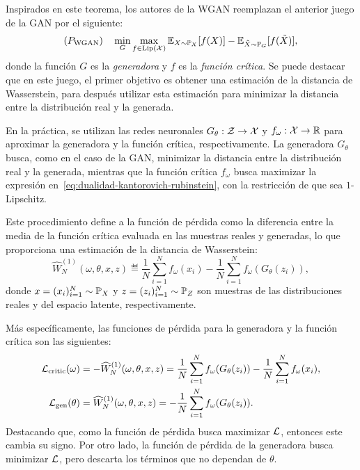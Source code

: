 Inspirados en este teorema, los autores de la WGAN \cite{arjovsky2017wasserstein} reemplazan el anterior juego de la GAN por el siguiente:
\begin{equation}\label{eq:wgan-game}
    (P_{\mathrm{WGAN}}) \quad \min_{G} \max_{f \in \Lip[\cX]} \Exp_{X\sim \Prob_X} [f(X)] - \Exp_{\tilde X \sim \Prob_G} [f(\tilde X)],
\end{equation}
donde la función $G$ es la \textit{generadora} y $f$ es la \textit{función crítica}. Se puede destacar que en este juego, el primer objetivo es obtener una estimación de la distancia de Wasserstein, para después utilizar esta estimación para minimizar la distancia entre la distribución real y la generada.

En la práctica, se utilizan las redes neuronales $G_\theta: \mathcal{Z} \to \mathcal{X}$ y $f_\omega: \mathcal{X} \to \mathbb{R}$ para aproximar la generadora y la función crítica, respectivamente.
La generadora $G_\theta$ busca, como en el caso de la GAN, minimizar la distancia entre la distribución real y la generada, mientras que la función crítica $f_\omega$ busca maximizar la expresión en~\eqref{eq:dualidad-kantorovich-rubinstein}, con la restricción de que sea $1$-Lipschitz.

Este procedimiento define a la función de pérdida como
la diferencia entre la media de la función crítica evaluada en las muestras reales y generadas, lo que proporciona una estimación de la distancia de Wasserstein:
\begin{equation}\label{eq:wasserstein-estimation}
    \widehat W_N^{(1)} (
    \omega, \theta, x, z
    )
    \eqdef \frac{1}{N}\sum_{i=1}^{N} f_\omega(x_i) - \frac{1}{N}\sum_{i=1}^{N} f_\omega(G_\theta(z_i)),
\end{equation}
donde $x = (x_i)_{i=1}^{N} \sim \Prob_X$ y $z = (z_i)_{i=1}^{N} \sim \Prob_Z$ son muestras de las distribuciones reales y del espacio latente, respectivamente.

Más específicamente, las funciones de pérdida para la generadora y la función crítica son las siguientes:
\begin{align}
    \mathcal{L}_{\mathrm{critic}}(\omega)
     & = -\widehat W_N^{(1)} (
    \omega, \theta, x, z
    )
    = \frac{1}{N}\sum_{i=1}^{N} f_\omega(G_\theta(z_i)) - \frac{1}{N}\sum_{i=1}^{N} f_\omega(x_i),
    \\ \mathcal{L}_{\mathrm{gen}}(\theta)
     & = \widehat W_N^{(1)} (
    \omega, \theta, x, z
    )
    = -\frac{1}{N}\sum_{i=1}^{N} f_\omega(G_\theta(z_i)).
\end{align}
Destacando que, como la función de pérdida busca maximizar $\mathcal{L}$, entonces este cambia su signo. Por otro lado, la función de pérdida de la generadora busca minimizar $\mathcal{L}$, pero descarta los términos que no dependan de $\theta$.

